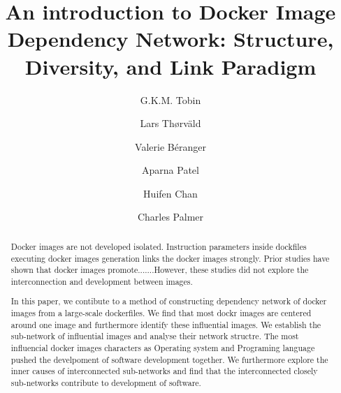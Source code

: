 \documentclass[sigconf]{acmart}
\begin{document}
\title{An introduction to Docker Image Dependency Network: Structure, Diversity, and Link Paradigm}


\author{G.K.M. Tobin}
\authornotemark[1]

\author{Lars Th{\o}rv{\"a}ld}

\author{Valerie B\'eranger}

\author{Aparna Patel}

\author{Huifen Chan}

\author{Charles Palmer}



\renewcommand{\shortauthors}{Trovato and Tobin, et al.}


\begin{abstract}
Docker images are not developed isolated. Instruction parameters inside dockfiles executing docker images generation links the docker images strongly. Prior studies have shown that docker images promote.......However, these studies did not explore the interconnection and development between images.

In this paper, we contibute to a method of constructing dependency network of docker images from a large-scale dockerfiles. We find that most dockr images are centered around one image and furthermore identify these influential images. We establish the sub-network of influential images and analyse their network structre. The most influencial docker images characters as Operating system and Programing language pushed the develpoment of software development together. We furthermore explore the inner causes of interconnected sub-networks and find that the interconnected closely sub-networks contribute to development of software.
\end{abstract}
\end{document}
